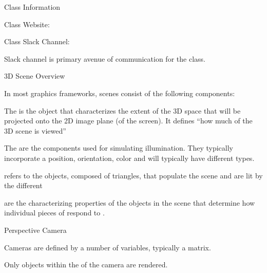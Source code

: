 \documentclass[11pt]{article}
\begin{document}
\maketitle

\begin{topic}{Class Information}
	\item Class Website: 
	\item Class Slack Channel:
	\item Slack channel is primary avenue of communication for the class.
\end{topic}

\begin{topic}{3D Scene Overview}
	\item In most graphics frameworks, scenes consist of the following components:
	\item The  is the object that characterizes the extent of the 3D space that will be projected onto the 2D image plane (of the screen). It defines ``how much of the 3D scene is viewed''
	\item The  are the components used for simulating illumination. They typically incorporate a position, orientation, color and will typically have different types.
	\item {} refers to the objects, composed of triangles, that populate the scene and are lit by the different 
	\item {} are the characterizing properties of the objects in the scene that determine how individual pieces of  respond to .
	\item {}
\end{topic}

\begin{topic}{Perspective Camera}
	\item Cameras are defined by a number of variables, typically a matrix.
	\item Only objects within the  of the camera are rendered.
\end{topic}
\end{document}
